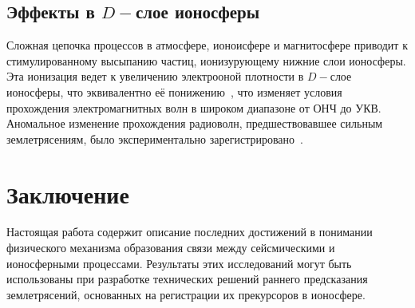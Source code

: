 \documentclass[12pt, oneside, a4paper]{article}
\begin{document}
\subsection{Эффекты в $D-$слое ионосферы}
Сложная цепочка процессов в атмосфере, ионоисфере и магнитосфере приводит к стимулированному высыпанию частиц, ионизурующему нижние слои ионосферы. Эта ионизация ведет к увеличению электрооной плотности в $D-$слое ионосферы, что эквивалентно её понижению~\cite{Kim:2002}, что изменяет условия прохождения электромагнитных волн в широком диапазоне от ОНЧ до УКВ. Аномальное изменение прохождения радиоволн, предшествовавшее сильным землетрясениям, было экспериментально зарегистрировано~\cite{Gufeld:1992}.  
\section{Заключение}
Настоящая работа содержит описание последних достижений в понимании физического механизма образования связи между сейсмическими и ионосферными процессами. Результаты этих исследований могут быть использованы при разработке технических решений раннего предсказания землетрясений, основанных на регистрации их прекурсоров в ионосфере. 
\newpage


\end{document}
